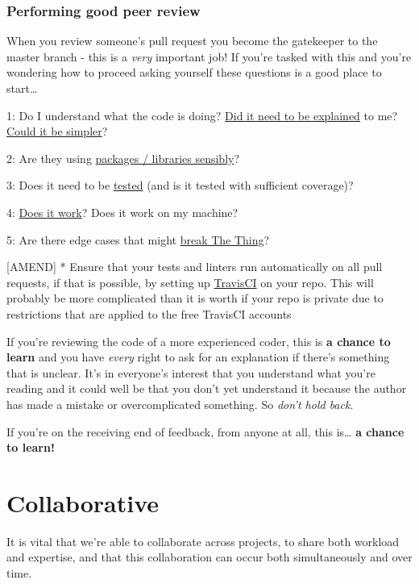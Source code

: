 \documentclass[]{book}
\begin{document}
\hypertarget{performing-good-peer-review}{%
\subsection*{Performing good peer review}\label{performing-good-peer-review}}

When you review someone's pull request you become the gatekeeper to the master branch - this is a \emph{very} important job! If you're tasked with this and you're wondering how to proceed asking yourself these questions is a good place to start\ldots{}

1: Do I understand what the code is doing? \protect\hyperlink{users}{Did it need to be explained} to me? \protect\hyperlink{ccc}{Could it be simpler}?

2: Are they using \protect\hyperlink{defaults}{packages / libraries sensibly}?

3: Does it need to be \protect\hyperlink{ccc}{tested} (and is it tested with sufficient coverage)?

4: \protect\hyperlink{ccc}{Does it work}? Does it work on my machine?

5: Are there edge cases that might \protect\hyperlink{errors}{break The Thing}?

{[}AMEND{]}
* Ensure that your tests and linters run automatically on all pull requests, if that is possible, by setting up \href{https://travis-ci.org/}{TravisCI} on your repo. This will probably be more complicated than it is worth if your repo is private due to restrictions that are applied to the free TravisCI accounts

If you're reviewing the code of a more experienced coder, this is \textbf{a chance to learn} and you have \emph{every} right to ask for an explanation if there's something that is unclear. It's in everyone's interest that you understand what you're reading and it could well be that you don't yet understand it because the author has made a mistake or overcomplicated something. So \emph{don't hold back}.

If you're on the receiving end of feedback, from anyone at all, this is\ldots{} \textbf{a chance to learn!}

\hypertarget{collaborate}{%
\chapter{Collaborative}\label{collaborate}}

It is vital that we're able to collaborate across projects, to share both workload and expertise, and that this collaboration can occur both simultaneously and over time.
\end{document}
